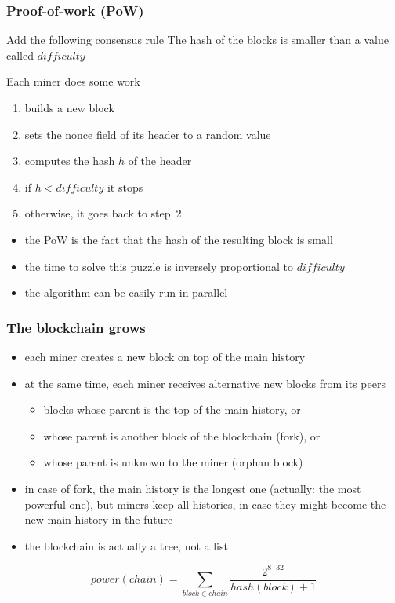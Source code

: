 \documentclass[11pt]{beamer}  %
\begin{document}
\begin{frame}\frametitle{Proof-of-work (PoW)}

  \begin{greenbox}{Add the following consensus rule}
    The hash of the blocks is smaller than
    a value called $\mathit{difficulty}$
  \end{greenbox}

  \bigskip

  \begin{greenbox}{Each miner does some work}
    \begin{enumerate}
    \item builds a new block
    \item sets the nonce field of its header to a random value
    \item computes the hash $h$ of the header
    \item if $h < \mathit{difficulty}$ it stops
    \item otherwise, it goes back to step~2
    \end{enumerate}
  \end{greenbox}

  \bigskip

  \begin{itemize}
  \item the PoW is the fact that the hash of the resulting block is small
  \item the time to solve this puzzle is inversely proportional to $\mathit{difficulty}$
  \item the algorithm can be easily run in parallel
  \end{itemize}

\end{frame}

\begin{frame}\frametitle{The blockchain grows}

  \begin{itemize}
  \item each miner creates a new block on top of the main history
  \item at the same time, each miner receives alternative new blocks from its peers
    \begin{itemize}
    \item blocks whose parent is the top of the main history, or
    \item whose parent is another block of the blockchain (fork), or
    \item whose parent is unknown to the miner (orphan block)
    \end{itemize}
  \item in case of fork, the main history is the longest one (actually: the most powerful one), but miners keep all histories,
    in case they might become the new main history in the future
  \item the blockchain is actually a tree, not a list
  \end{itemize}

  \[
  \mathit{power}(\mathit{chain})=\sum_{\mathit{block}\in\mathit{chain}}\frac{2^{8\cdot 32}}{\mathit{hash}(\mathit{block})+1}
  \]
\end{frame}
\end{document}

